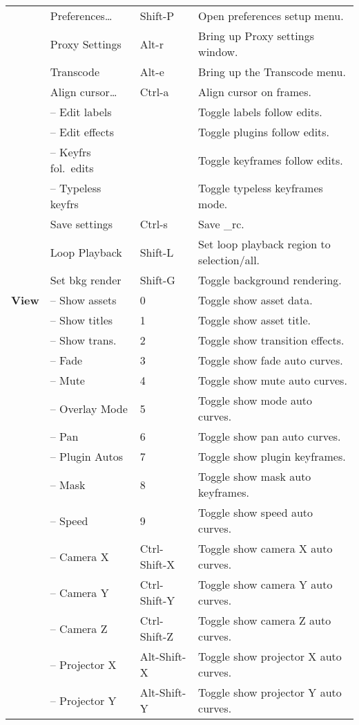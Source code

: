 \begin{longtable}[h]{>{\bfseries}p{}p{}p{}p{}}
  & Preferences\dots & Shift-P & Open preferences setup menu. \\
  & Proxy Settings & Alt-r & Bring up Proxy settings window. \\
  & Transcode & Alt-e & Bring up the Transcode menu. \\
  & Align cursor\dots & Ctrl-a & Align cursor on frames. \\
  & -- Edit labels &  & Toggle labels follow edits. \\
  & -- Edit effects &  & Toggle plugins follow edits. \\
  & -- Keyfrs fol.\ edits &  & Toggle keyframes follow edits. \\
  & -- Typeless keyfrs &  & Toggle typeless keyframes mode. \\
  & Save settings & Ctrl-s & Save \CGG{}\_rc. \\
  & Loop Playback & Shift-L & Set loop playback region to selection/all. \\
  & Set bkg render & Shift-G & Toggle background rendering. \\
  \midrule
  \textcolor{CinBlueText}{View} & -- Show assets & 0 & Toggle show asset data. \\
  & -- Show titles & 1 & Toggle show asset title. \\
  & -- Show trans. & 2 & Toggle show transition effects. \\
  & -- Fade & 3 & Toggle show fade auto curves. \\
  & -- Mute & 4 & Toggle show mute auto curves. \\
  & -- Overlay Mode & 5 & Toggle show mode auto curves. \\
  & -- Pan & 6 & Toggle show pan auto curves. \\
  & -- Plugin Autos & 7 & Toggle show plugin keyframes. \\
  & -- Mask & 8 & Toggle show mask auto keyframes. \\
  & -- Speed & 9 & Toggle show speed auto curves. \\
  & -- Camera X & Ctrl-Shift-X & Toggle show camera X auto curves. \\
  & -- Camera Y & Ctrl-Shift-Y & Toggle show camera Y auto curves. \\
  & -- Camera Z & Ctrl-Shift-Z & Toggle show camera Z auto curves. \\
  & -- Projector X & Alt-Shift-X & Toggle show projector X auto curves. \\
  & -- Projector Y & Alt-Shift-Y & Toggle show projector Y auto curves. \\

\end{longtable}
